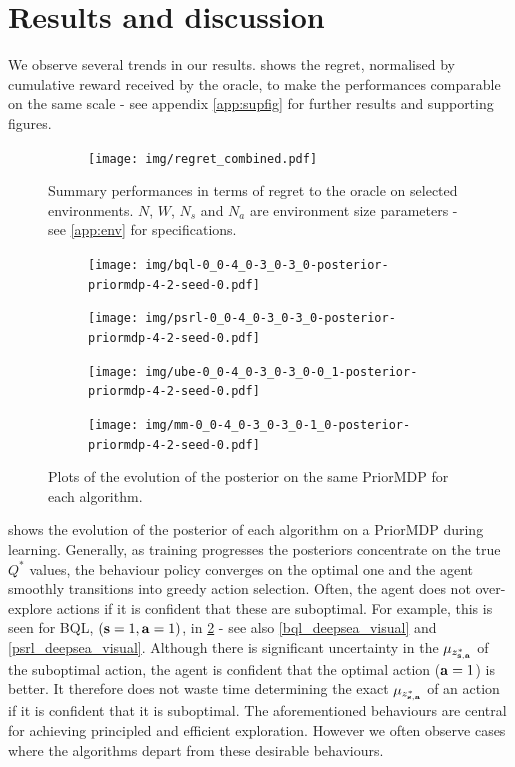 \documentclass{article}
\begin{document}
\section{Results and discussion}

We observe several trends in our results.  shows the regret, normalised by cumulative reward received by the oracle, to make the performances comparable on the same scale - see appendix \ref{app:supfig} for further results and supporting figures.
\begin{figure}[h!]
\centering
\begin{subfigure}{1.\textwidth}
\texttt{[image: img/regret\_combined.pdf]}
\end{subfigure}
\captionsetup{width=0.9\linewidth}
\caption{Summary performances in terms of regret to the oracle on selected environments. $N$, $W$, $N_s$ and $N_a$ are environment size parameters - see \cref{app:env} for specifications.}\label{combined_regret_summary}
\end{figure}
\begin{figure}[h!]
\centering
\begin{subfigure}{0.49\textwidth}
\texttt{[image: img/bql-0\_0-4\_0-3\_0-3\_0-posterior-priormdp-4-2-seed-0.pdf]}
\end{subfigure}
\begin{subfigure}{0.49\textwidth}
\texttt{[image: img/psrl-0\_0-4\_0-3\_0-3\_0-posterior-priormdp-4-2-seed-0.pdf]}
\end{subfigure}
\begin{subfigure}{0.49\textwidth}
\texttt{[image: img/ube-0\_0-4\_0-3\_0-3\_0-0\_1-posterior-priormdp-4-2-seed-0.pdf]}
\end{subfigure}
\begin{subfigure}{0.49\textwidth}
\texttt{[image: img/mm-0\_0-4\_0-3\_0-3\_0-1\_0-posterior-priormdp-4-2-seed-0.pdf]}
\end{subfigure}
\captionsetup{width=0.9\linewidth}
\caption{Plots of the evolution of the posterior on the same PriorMDP for each algorithm.}\label{combined_posterior_evolution}
\end{figure}
 shows the evolution of the posterior of each algorithm on a PriorMDP during learning. Generally, as training progresses the posteriors concentrate on the true $Q^*$ values, the behaviour policy converges on the optimal one and the agent smoothly transitions into greedy action selection. Often, the agent does not over-explore actions if it is confident that these are suboptimal. For example, this is seen for BQL, $(\mathbf{s} = 1, \mathbf{a} = 1)$, in \cref{combined_posterior_evolution} - see also \cref{bql_deepsea_visual} and \cref{psrl_deepsea_visual}. Although there is significant uncertainty in the $\mu_{z^*_{\mathbf{s}, \mathbf{a}}}$ of the suboptimal action, the agent is confident that the optimal action ($\mathbf{a} = 1$) is better. It therefore does not waste time determining the exact $\mu_{z^*_{\mathbf{s}, \mathbf{a}}}$ of an action if it is confident that it is suboptimal. The aforementioned behaviours are central for achieving principled and efficient exploration. However we often observe cases where the algorithms depart from these desirable behaviours.
\end{document}
